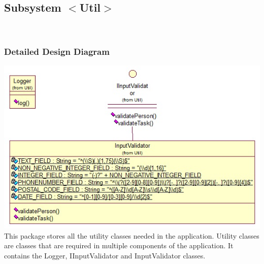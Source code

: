 \subsection{Subsystem $<$Util$>$}
\\
\subsubsection{Detailed Design Diagram}
\includegraphics{diagrams/utils_class_diagram}
\\
This package stores all the utility classes needed in the application. Utility classes are classes that are required in multiple components of the application. It contains the Logger, IInputValidator and InputValidator classes.
\\
